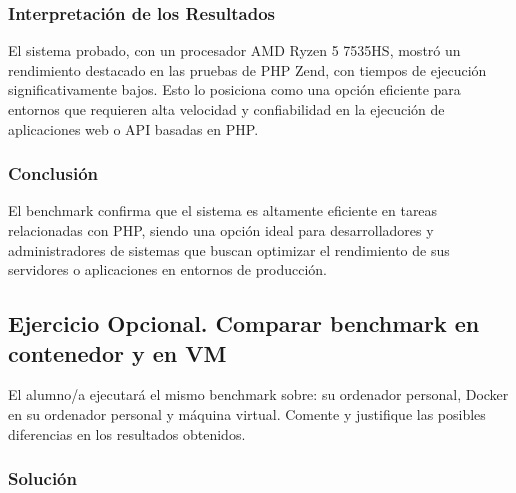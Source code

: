 \subsubsection{Interpretación de los Resultados}

El sistema probado, con un procesador AMD Ryzen 5 7535HS, mostró un rendimiento destacado en las pruebas de PHP Zend, con tiempos de ejecución significativamente bajos. Esto lo posiciona como una opción eficiente para entornos que requieren alta velocidad y confiabilidad en la ejecución de aplicaciones web o API basadas en PHP.

\subsubsection{Conclusión}

El benchmark confirma que el sistema es altamente eficiente en tareas relacionadas con PHP, siendo una opción ideal para desarrolladores y administradores de sistemas que buscan optimizar el rendimiento de sus servidores o aplicaciones en entornos de producción.


\subsection{Ejercicio Opcional. Comparar benchmark en contenedor y en VM}

El alumno/a ejecutará el mismo benchmark sobre: su ordenador personal, Docker en su ordenador personal y máquina virtual. Comente y justifique las posibles diferencias en los resultados obtenidos.

\subsubsection{Solución}

